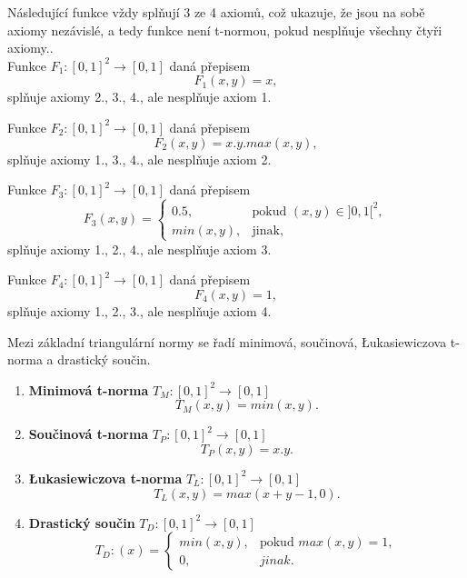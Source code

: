 \begin{example} N\'asleduj\'ic\'i funkce vždy spl\v nují 3 ze 4  axiom\r u, což ukazuje, že jsou na sobě axiomy nez\' avislé, a tedy funkce není t-normou, pokud nespl\v nuje všechny čtyři axiomy..\\ 
    Funkce $F_1 : [0, 1]^2 \to [0, 1]$ daná přepisem
    $$F_1(x,y) = x,$$
    spl\v nuje axiomy 2., 3., 4., ale nespl\v nuje axiom 1.
    
    Funkce $F_2 : [0, 1]^2 \to [0, 1]$ daná přepisem
    $$F_2(x,y) = x.y.max(x,y),$$
    spl\v nuje axiomy 1., 3., 4., ale nespl\v nuje axiom 2.

    Funkce $F_3 : [0, 1]^2 \to [0, 1]$ daná přepisem
    $$ F_3(x,y)=\begin{cases} 0.5, & \mbox{pokud }(x, y) \in ]0,1[^2, \\
         min(x,y), & \mbox{jinak,}\end{cases} $$
    spl\v nuje axiomy 1., 2., 4., ale nespl\v nuje axiom 3.
    
    Funkce $F_4 : [0, 1]^2 \to [0, 1]$ daná přepisem
    $$F_4(x,y) = 1,$$
    spl\v nuje axiomy 1., 2., 3., ale nespl\v nuje axiom 4.

  \end{example}

Mezi základní triangulární normy se řadí minimová, součinová, Łukasiewiczova t-norma a drastický součin.
\begin{example}
\cite{KMP}
    \begin{enumerate}
    \item \textbf{Minimová t-norma} $T_M: [0,1]^2 \rightarrow [0,1]$
    $$T_M(x,y) = min(x,y).$$
    \item \textbf{Součinová t-norma} $T_P: [0,1]^2 \rightarrow [0,1]$
    $$T_P(x,y) = x.y.$$
    \item \textbf{Łukasiewiczova t-norma} $T_L: [0,1]^2 \rightarrow [0,1]$
    $$T_L(x,y) = max(x+y-1,0).$$
    \item \textbf{Drastický součin} $T_D: [0,1]^2 \rightarrow [0,1]$
    $$T_D:(x)=\begin{cases} min(x,y), & \mbox{pokud }  max(x,y) = 1,\\ 
    0, &  jinak.  \end{cases}$$\\
\end{enumerate}
\end{example}


